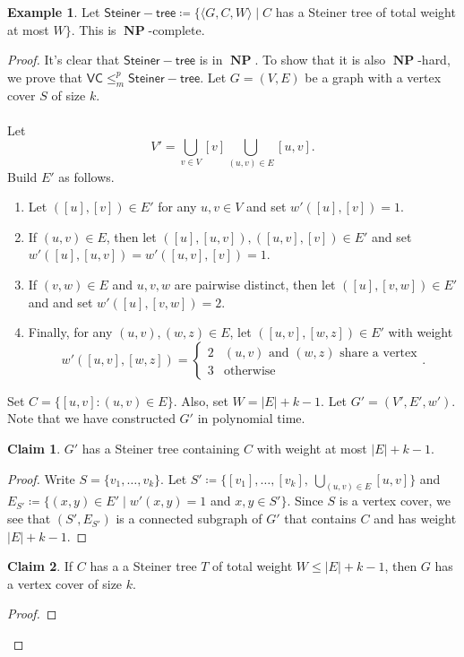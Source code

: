 \documentclass[10pt,letterpaper,cm]{nupset}
\theoremstyle{definition}
\newtheorem{exmp}{Example}
\newtheorem{claim}{Claim}
\newcommand{\1}{\mathbf{1}}
\newcommand{\0}{\vec 0}
\DeclareMathOperator{\NP}{\mathbf{NP}}
\begin{document}
\begin{exmp}
Let $\mathsf{Steiner{-}tree} \coloneqq \{\langle G, C, W \rangle \mid C$ has a Steiner tree of total weight at most $W\}$. This is $\NP$-complete.
\end{exmp}
\begin{proof}
It's clear that $\mathsf{Steiner{-}tree} $ is in $\NP$. To show that it is also $\NP$-hard, we prove that $\mathsf{VC} \leq_m^p \mathsf{Steiner{-}tree} $. Let $G = (V, E)$ be a graph with a vertex cover $S$ of size $k$. 
\\ \\ Let $$V' = \bigcup_{v \in V} [v] \bigcup_{(u,v) \in E}[u,v].$$ Build $E'$ as follows. 
\begin{enumerate}[label=(\alph*)]
\item Let $([u], [v])\in E'$ for any $u,v \in V$ and set $w'([u], [v])=1$. 
\item If $(u,v) \in E$, then let $([u], [u,v]), ([u, v], [v]) \in E'$ and set $w'([u], [u,v]) = w'([u,v], [v]) =1$. 
\item If $(v,w) \in E$ and $u,v,w$ are pairwise distinct, then let $([u], [v,w]) \in E'$ and and set $w'([u], [v,w]) = 2$.
\item Finally, for any $(u,v), (w,z) \in E$, let $([u,v], [w,z])\in E'$  with weight $$w'([u,v], [w,z]) = \begin{cases} 2 & (u,v) \text{ and } (w,z) \text{ share a vertex} \\ 3 & \text{otherwise} \end{cases}.$$ 
\end{enumerate}
Set $C = \{ [u,v] : (u,v) \in E\}$. Also, set $W= |E|+ k -1$. Let $G' = (V', E', w')$. Note that we have constructed $G'$ in polynomial time.
\begin{claim}
$G'$ has a Steiner tree containing $C$ with weight at most $|E| + k -1$.
\end{claim}
\begin{proof}
Write $S = \{v_1, \ldots, v_k\}$. Let $S' \coloneqq \{[v_1], \ldots, [v_k], \ \bigcup_{(u,v) \in E}[u,v]\}$ and $E_{S'} \coloneqq \{ (x,y)\in E' \mid w'(x,y)=1$ and $x,y\in S'\}$. Since $S$ is a vertex cover, we see that $(S', E_{S'})$ is a connected subgraph of $G'$ that contains $C$ and has weight $|E|+k -1$.
\end{proof}
\begin{claim}
If $C$ has a a Steiner tree $T$ of total weight $W \leq |E| +k -1$, then $G$ has a vertex cover of size $k$. 
\end{claim}
\begin{proof}

\end{proof}
\end{proof}
\end{document}
